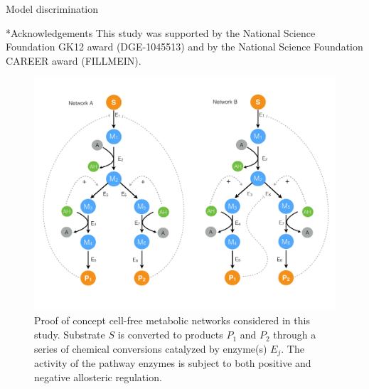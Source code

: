 \documentclass[12pt]{article}
\makeatletter
\renewcommand\subsection{\@startsection
	{subsection}{2}{0mm}
	{-0.05in}
	{-0.5\baselineskip}
	{\normalfont\normalsize\bfseries}}
\renewcommand\section{\@startsection
	{subsection}{2}{0mm}
	{-0.2in}
	{0.05\baselineskip}
	{\normalfont\large\bfseries}}
\makeatother
\begin{document}
\subsection{Model discrimination}


\section*{Acknowledgements}
This study was supported by the National Science Foundation GK12 award (DGE-1045513) 
and by the National Science Foundation CAREER award (FILLMEIN).

\clearpage
%
%




\clearpage

\begin{figure}
\centering
\includegraphics[width=1.0\textwidth]{./figs/Figure-1-Networks.pdf}
\caption{Proof of concept cell-free metabolic networks considered in this study. Substrate $S$ is converted to products $P_{1}$ and $P_{2}$ through a series of chemical conversions
catalyzed by enzyme(s) $E_{j}$. The activity of the pathway enzymes is subject to both positive and negative allosteric regulation. }\label{fig-networks}
\end{figure}

\clearpage
\end{document}
